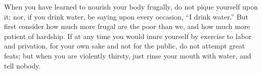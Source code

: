 When you have learned to nourish your body frugally, do not pique yourself upon
it; nor, if you drink water, be  saying upon every occasion, ``I drink water.''
But first consider how much more frugal are the poor than we, and how much more
patient of  hardship. If at  any time you would  inure yourself by  exercise to
labor and privation, for  your own sake and not for the  public, do not attempt
great feats;  but when you  are violently thirsty,  just rinse your  mouth with
water, and tell nobody.
